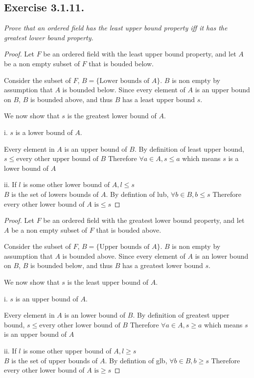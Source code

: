 \documentclass[12pt, a4paper]{article}
\begin{document}
    \subsection*{Exercise 3.1.11.}
        \textit{Prove that an ordered field has the least upper bound
        property iff it has the greatest lower bound property.}
        \begin{proof}
        Let $F$ be an ordered field with the least upper bound property, and let $A$ be a non empty subset of $F$ that is bouded below.

    Consider the subset of $F$, $B = \{ \text{Lower bounds of } A \}$.
        $B$ is non empty by assumption that $A$ is bounded below.
        Since every element of $A$ is an upper bound on $B$, $B$ is bounded above, and thus $B$ has a least upper bound $s$.

    \noindent We now show that $s$ is the greatest lower bound of $A$.

        i. $s$ is a lower bound of $A$. 
        
        Every element in $A$ is an upper bound of $B$. 
        By definition of least upper bound, $s \le \text{every other upper bound of } B$
        Therefore $\forall a \in A, s \le a$ which means $s$ is a lower bound of $A$
        
        ii. If $l$ is some other lower bound of $A, l \le s$ 
        \\$B$ is the set of lowers bounds of $A$. By defintion of lub, $\forall b\in B, b \le s$
        Therefore every other lower bound of $A \text{ is} \le s$
        \end{proof}
        \begin{proof}
            Let $F$ be an ordered field with the greatest lower bound property, and let $A$ be a non empty subset of $F$ that is bouded above.
    
        Consider the subset of $F$, $B = \{ \text{Upper bounds of } A \}$.
            $B$ is non empty by assumption that $A$ is bounded above.
            Since every element of $A$ is an lower bound on $B$, $B$ is bounded below, and thus $B$ has a greatest lower bound $s$.
    
        \noindent We now show that $s$ is the least upper bound of $A$.
    
            i. $s$ is an upper bound of $A$. 
            
            Every element in $A$ is an lower bound of $B$. 
            By definition of greatest upper bound, $s \le \text{every other lower bound of } B$
            Therefore $\forall a \in A, s \ge a$ which means $s$ is an upper bound of $A$
            
            ii. If $l$ is some other upper bound of $A, l \ge s$ 
            \\$B$ is the set of upper bounds of $A$. By defintion of glb, $\forall b\in B, b \ge s$
            Therefore every other lower bound of $A \text{ is} \ge s$ 
            \end{proof}
        \pagebreak
\end{document}
